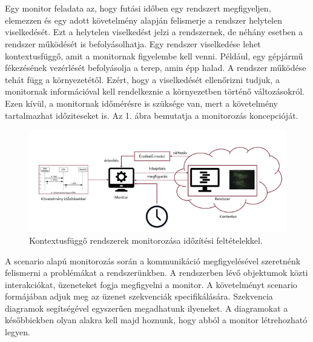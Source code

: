 \chapter{\bevezetes}

Egy monitor feladata az, hogy futási időben egy rendszert megfigyeljen, elemezzen és egy adott követelmény alapján felismerje a rendszer helytelen viselkedését. Ezt a helytelen viselkedést jelzi a rendszernek, de néhány esetben a rendszer működését is befolyásolhatja. Egy rendszer viselkedése lehet kontextusfüggő, amit a monitornak figyelembe kell venni. Például, egy gépjármű fékezésének vezérlését befolyásolja a terep, amin épp halad. A rendszer működése tehát függ a környezetétől. Ezért, hogy a viselkedését ellenőrizni tudjuk, a monitornak információval kell rendelkeznie a környezetben történő változásokról. Ezen kívül, a monitornak időmérésre is szüksége van, mert a követelmény tartalmazhat időziteseket is. Az 1. ábra bemutatja a monitorozás koncepcióját.

\begin{figure}[!ht]
    \centering
    \includegraphics[width=150mm, keepaspectratio]{figures/1abra.png}
    \caption{Kontextusfüggő rendszerek monitorozása időzítési feltételekkel.}
\end{figure}

A scenario alapú monitorozás során a kommunikáció megfigyelésével szeretnénk felismerni a problémákat a rendszerünkben. A rendszerben lévő objektumok közti interakciókat, üzeneteket fogja megfigyelni a monitor. A követelményt scenario formájában adjuk meg az üzenet szekvenciák specifikálására. Szekvencia diagramok segítségével egyszerűen megadhatunk ilyeneket. A diagramokat a későbbiekben olyan alakra kell majd hoznunk, hogy abból a monitor létrehozható legyen.
